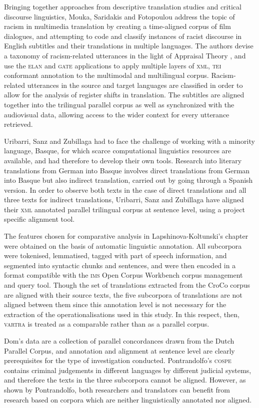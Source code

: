 \documentclass[output=paper]{LSP/langsci}
\begin{document}
Bringing together approaches from descriptive translation studies and critical discourse linguistics, Mouka, Saridakis and Fotopoulou address the topic of racism in multimedia translation by creating a time-aligned corpus of film dialogues, and attempting to code and classify instances of racist discourse in English subtitles and their translations in multiple languages. The authors devise a taxonomy of racism-related utterances in the light of Appraisal Theory \citep{MartinWhite2005}, and use the \textsc{elan} and \textsc{gate} applications to apply multiple layers of \textsc{xml}, \textsc{tei} conformant annotation to the multimodal and multilingual corpus. Racism-related utterances in the source and target languages are classified in order to allow for the analysis of register shifts in translation. The subtitles are aligned together into the trilingual parallel corpus as well as synchronized with the audiovisual data, allowing access to the wider context for every utterance retrieved. 

Uribarri, Sanz and Zubillaga had to face the challenge of working with a minority language, Basque, for which scarce computational linguistics resources are available, and had therefore to develop their own tools. Research into literary translations from German into Basque involves direct translations from German into Basque but also indirect translation, carried out by going through a Spanish version. In order to observe both texts in the case of direct translations and all three texts for indirect translations, Uribarri, Sanz and Zubillaga have aligned their \textsc{xml} annotated parallel trilingual corpus at sentence level, using a project specific alignment tool.

The features chosen for comparative analysis in Lapshinova-Koltunski’s chapter were obtained on the basis of automatic linguistic annotation. All subcorpora were tokenised, lemmatised, tagged with part of speech information, and segmented into syntactic chunks and sentences, and were then encoded in a format compatible with the \textsc{ims} Open Corpus Workbench corpus management and query tool. Though the set of translations extracted from the CroCo corpus are aligned with their source texts, the five subcorpora of translations are not aligned between them since this annotation level is not necessary for the extraction of the operationalisations used in this study. In this respect, then, \textsc{vartra} is treated as a comparable rather than as a parallel corpus.

Dom’s data are a collection of parallel concordances drawn from the Dutch Parallel Corpus, and annotation and alignment at sentence level are clearly prerequisites for the type of investigation conducted. Pontrandolfo’s \textsc{cospe} contains criminal judgements in different languages by different judicial systems, and therefore the texts in the three subcorpora cannot be aligned. However, as shown by Pontrandolfo, both researchers and translators can benefit from research based on corpora which are neither linguistically annotated nor aligned. 
\end{document}

